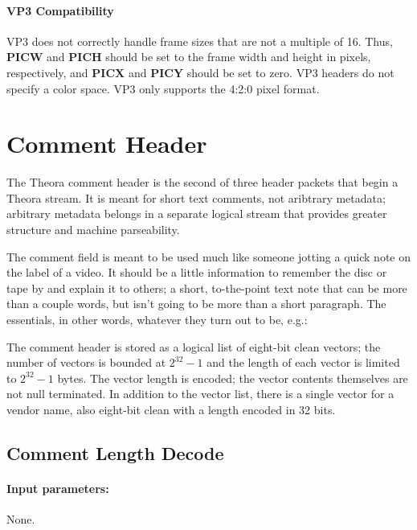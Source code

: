 \documentclass[11pt,letterpaper]{book}
\newcommand{\bitvar}[1]{\ensuremath{\mathbf{\bm #1}}}
\numberwithin{equation}{chapter}
\numberwithin{figure}{chapter}
\numberwithin{table}{chapter}
\begin{document}
\paragraph{VP3 Compatibility}

VP3 does not correctly handle frame sizes that are not a multiple of 16.
Thus, \bitvar{PICW} and \bitvar{PICH} should be set to the frame width and
 height in pixels, respectively, and \bitvar{PICX} and \bitvar{PICY} should be
 set to zero.
VP3 headers do not specify a color space.
VP3 only supports the 4:2:0 pixel format.

\section{Comment Header}
\label{sec:commentheader}

The Theora comment header is the second of three header packets that begin a
 Theora stream.
It is meant for short text comments, not aribtrary metadata; arbitrary metadata
 belongs in a separate logical stream that provides greater structure and
 machine parseability.

The comment field is meant to be used much like someone jotting a quick note on
 the label of a video.
It should be a little information to remember the disc or tape by and explain it to
 others; a short, to-the-point text note that can be more than a couple words,
 but isn't going to be more than a short paragraph.
The essentials, in other words, whatever they turn out to be, e.g.:


The comment header is stored as a logical list of eight-bit clean vectors; the
 number of vectors is bounded at $2^{32}-1$ and the length of each vector is
 limited to $2^{32}-1$ bytes.
The vector length is encoded; the vector contents themselves are not null
 terminated.
In addition to the vector list, there is a single vector for a vendor name,
 also eight-bit clean with a length encoded in 32 bits.

\subsection{Comment Length Decode}
\label{sub:comment-len}

\paragraph{Input parameters:} None.
\end{document}
